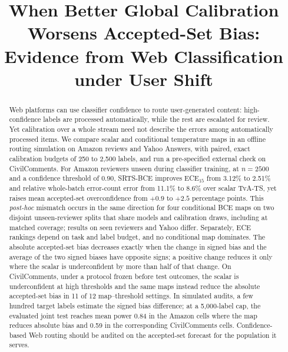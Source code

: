 \documentclass[sigconf,anonymous,review]{acmart}
\begin{document}
\title{When Better Global Calibration Worsens Accepted-Set Bias:
Evidence from Web Classification under User Shift}

\begin{abstract}
Web platforms can use classifier confidence to route user-generated content:
high-confidence labels are processed automatically, while the rest are
escalated for review. Yet calibration over a whole stream need not
describe the errors among automatically processed items. We compare
scalar and conditional temperature maps in an offline routing simulation
on Amazon reviews and Yahoo Answers, with paired, exact calibration
budgets of 250 to 2{,}500 labels, and run a pre-specified external check on CivilComments.
For Amazon reviewers unseen during classifier training, at $n{=}2500$ and
a confidence threshold of $0.90$, SRTS-BCE improves ECE$_{15}$ from 3.12\%
to 2.51\% and relative whole-batch error-count error from 11.1\% to 8.6\%
over scalar TvA-TS, yet raises mean accepted-set overconfidence from
$+0.9$ to $+2.5$ percentage points. This \emph{post-hoc} mismatch occurs
in the same direction for four conditional BCE maps on two disjoint
unseen-reviewer splits that share models and calibration draws,
including at matched coverage; results on seen reviewers and Yahoo
differ. Separately, ECE rankings depend on task and label budget, and no
conditional map dominates. The absolute accepted-set bias decreases exactly when the change in
signed bias and the average of the two signed biases have opposite signs;
a positive change reduces it only where the scalar is underconfident by
more than half of that change. On CivilComments, under a protocol frozen before test
outcomes, the scalar is underconfident at high thresholds and the same
maps instead reduce the absolute accepted-set bias in 11 of 12
map--threshold settings. In simulated audits, a few hundred target labels estimate the signed
bias difference; at a 5{,}000-label cap, the evaluated joint test reaches
mean power 0.84 in the Amazon cells where the map reduces absolute bias
and 0.59 in the corresponding CivilComments cells.
Confidence-based Web routing should be audited on the accepted-set
forecast for the population it serves.
\end{abstract}



\maketitle
\end{document}
